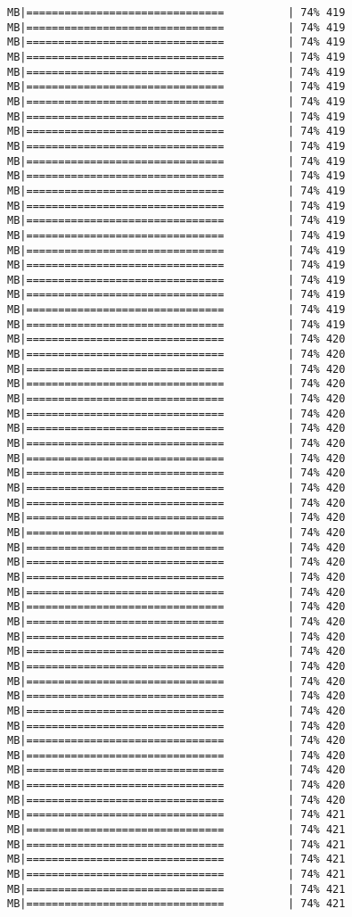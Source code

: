 \documentclass[
]{article}
\begin{document}
\begin{verbatim}
MB|===============================          | 74% 419 MB|===============================          | 74% 419 MB|===============================          | 74% 419 MB|===============================          | 74% 419 MB|===============================          | 74% 419 MB|===============================          | 74% 419 MB|===============================          | 74% 419 MB|===============================          | 74% 419 MB|===============================          | 74% 419 MB|===============================          | 74% 419 MB|===============================          | 74% 419 MB|===============================          | 74% 419 MB|===============================          | 74% 419 MB|===============================          | 74% 419 MB|===============================          | 74% 419 MB|===============================          | 74% 419 MB|===============================          | 74% 419 MB|===============================          | 74% 419 MB|===============================          | 74% 419 MB|===============================          | 74% 419 MB|===============================          | 74% 419 MB|===============================          | 74% 419 MB|===============================          | 74% 420 MB|===============================          | 74% 420 MB|===============================          | 74% 420 MB|===============================          | 74% 420 MB|===============================          | 74% 420 MB|===============================          | 74% 420 MB|===============================          | 74% 420 MB|===============================          | 74% 420 MB|===============================          | 74% 420 MB|===============================          | 74% 420 MB|===============================          | 74% 420 MB|===============================          | 74% 420 MB|===============================          | 74% 420 MB|===============================          | 74% 420 MB|===============================          | 74% 420 MB|===============================          | 74% 420 MB|===============================          | 74% 420 MB|===============================          | 74% 420 MB|===============================          | 74% 420 MB|===============================          | 74% 420 MB|===============================          | 74% 420 MB|===============================          | 74% 420 MB|===============================          | 74% 420 MB|===============================          | 74% 420 MB|===============================          | 74% 420 MB|===============================          | 74% 420 MB|===============================          | 74% 420 MB|===============================          | 74% 420 MB|===============================          | 74% 420 MB|===============================          | 74% 420 MB|===============================          | 74% 420 MB|===============================          | 74% 420 MB|===============================          | 74% 421 MB|===============================          | 74% 421 MB|===============================          | 74% 421 MB|===============================          | 74% 421 MB|===============================          | 74% 421 MB|===============================          | 74% 421 MB|===============================          | 74% 421 
\end{verbatim}
\end{document}

